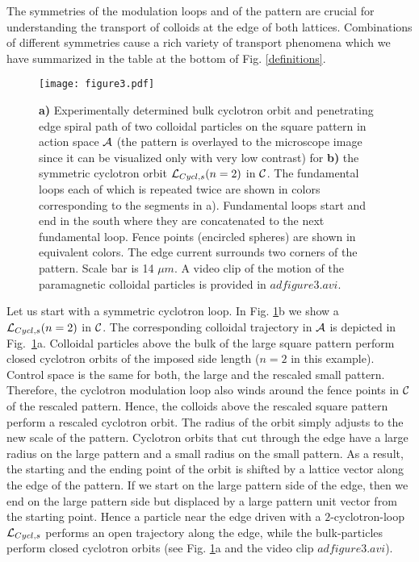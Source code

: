\documentclass[12pt]{iopart}
\begin{document}
The symmetries of the modulation loops and of the pattern are crucial for understanding the transport of colloids at the edge of both lattices. Combinations of different symmetries cause a rich variety of transport phenomena which we have summarized in the table at the bottom of Fig. \ref{definitions}. 







\begin{figure}
	\texttt{[image: figure3.pdf]}
	\caption{ {\bf a)} Experimentally determined bulk cyclotron orbit and penetrating edge spiral path of
		two colloidal particles on the square pattern in action space $\cal A$ (the pattern is overlayed to the microscope image since it can be visualized only with very low contrast) for {\bf b)} the symmetric cyclotron orbit ${\cal L}_{Cycl,s}(n=2)$ in $\cal C$. The fundamental loops each of which is repeated twice are shown in colors corresponding to the segments in a). Fundamental loops start and end in the south where they are concatenated to the next fundamental loop. Fence points (encircled spheres) are shown in equivalent colors. The edge current surrounds two corners of the pattern. Scale bar is 14 $\mu m$. A video clip of the motion of the paramagnetic colloidal particles is provided in $adfigure3.avi$.}\label{fig2}
\end{figure}

Let us start with a symmetric cyclotron loop.
In Fig. \ref{fig2}b we show a ${\cal L}_{Cycl,s}(n=2)$ in $\cal C$.
The corresponding colloidal trajectory in $\cal A$ is depicted in Fig.~\ref{fig2}a.
Colloidal particles above the bulk of the large square pattern perform closed 
cyclotron orbits of the imposed side length ($n=2$ in this example). Control space is the same
for both, the large and the rescaled small pattern. Therefore, the cyclotron modulation loop also winds around the
fence points in $\cal C$ of the rescaled pattern.
Hence, the colloids above the rescaled square pattern perform a rescaled cyclotron orbit.
The radius of the orbit simply adjusts to the new scale of the pattern. Cyclotron orbits that cut through the edge
have a large radius on the large pattern and a small radius on the small pattern. As a result, the starting and the
ending point of the orbit is shifted by a lattice vector along the edge of the pattern. 
If we start on the large pattern side of the edge, then we end on the large pattern side but displaced
by a large pattern unit vector from the starting point. Hence a particle near the edge driven with a $2$-cyclotron-loop
${\cal L}_{Cycl,s}$ performs an open trajectory along the edge, while the bulk-particles perform
closed cyclotron orbits  (see Fig. \ref{fig2}a and the video clip $adfigure3.avi$). 
\end{document}
